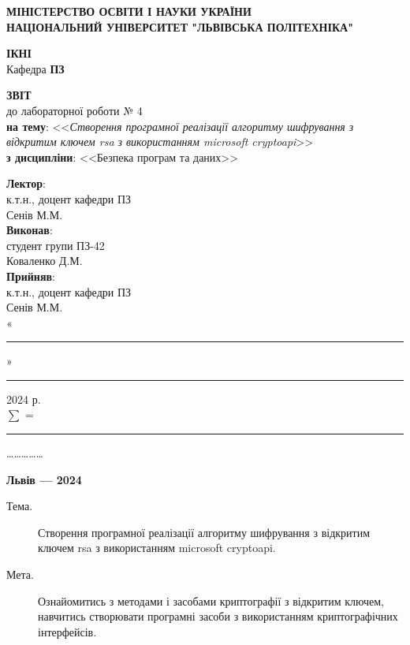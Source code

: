\documentclass[oneside,14pt]{extarticle}
\newcommand\subject{Безпека програм та даних}
\newcommand\lecturer{к.т.н., доцент кафедри ПЗ\\Сенів М.М.}
\newcommand\teacher{к.т.н., доцент кафедри ПЗ\\Сенів М.М.}
\newcommand\mygroup{ПЗ-42}
\newcommand\lab{4}
\newcommand\theme{Створення програмної реалізації алгоритму шифрування з відкритим ключем rsa з використанням microsoft cryptoapi}
\newcommand\purpose{Ознайомитись з методами і засобами криптографії з
	відкритим ключем, навчитись створювати програмні засоби з використанням
	криптографічних інтерфейсів}
\begin{document}
\begin{normalsize}
	\begin{titlepage}
		\thispagestyle{empty}
		\begin{center}
			\textbf{МІНІСТЕРСТВО ОСВІТИ І НАУКИ УКРАЇНИ\\
				НАЦІОНАЛЬНИЙ УНІВЕРСИТЕТ "ЛЬВІВСЬКА ПОЛІТЕХНІКА"}
		\end{center}
		\begin{flushright}
			\textbf{ІКНІ}\\
			Кафедра \textbf{ПЗ}
		\end{flushright}
		\vspace{80pt}
		\begin{center}
			\textbf{ЗВІТ}\\
			\vspace{10pt}
			до лабораторної роботи № \lab\\
			\textbf{на тему}: <<\textit{\theme}>>\\
			\textbf{з дисципліни}: <<\subject>>
		\end{center}
		\vspace{80pt}
		\begin{flushright}
			
			\textbf{Лектор}:\\
			\lecturer\\
			\vspace{28pt}
			\textbf{Виконав}:\\
			
			студент групи \mygroup\\
			Коваленко Д.М.\\
			\vspace{28pt}
			\textbf{Прийняв}:\\
			
			\teacher\\
			
			\vspace{28pt}
			«\rule{1cm}{0.15mm}» \rule{1.5cm}{0.15mm} 2024 р.\\
			$\sum$ = \rule{1cm}{0.15mm}……………\\
			
		\end{flushright}
		\vspace{\fill}
		\begin{center}
			\textbf{Львів — 2024}
		\end{center}
	\end{titlepage}
		
	\begin{description}
		\item[Тема.] \theme.
		\item[Мета.] \purpose.
	\end{description}


\end{normalsize}
\end{document}
